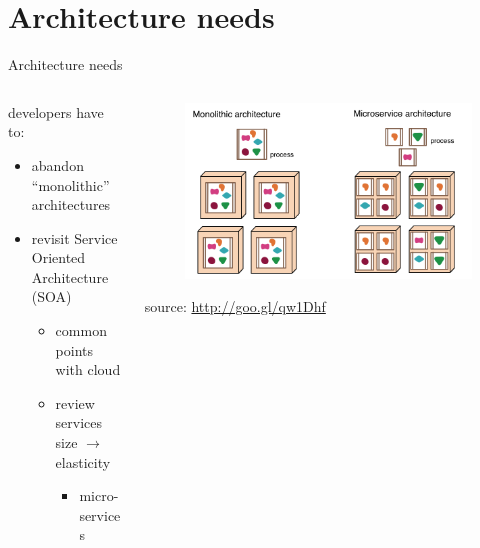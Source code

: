 %
%
\section{Architecture needs}
\begin{frame}{Architecture needs}
	\only<1>
	{
		\begin{columns}
			\begin{column}{0.65\textwidth}
				developers have to:
				\begin{itemize}
					\item{\footnotesize{abandon ``monolithic'' architectures}}
					\item{\footnotesize{revisit Service Oriented Architecture (SOA)}}
					\begin{itemize}
						\item{\scriptsize{common points with cloud}}
						\item{\scriptsize{review services size $\rightarrow{}$ elasticity}}
						\begin{itemize}
							\item{\tiny{micro-services}}
						\end{itemize}
					\end{itemize}
				\end{itemize}
			\end{column}
			\begin{column}{0.35\textwidth}
				\begin{figure}
					\centering{}
					\includegraphics[scale=0.14]{images/micro-services.png}
				\end{figure}
				\begin{flushright}
					\tiny{source: \url{http://goo.gl/qw1Dhf}}
				\end{flushright}
			\end{column}
		\end{columns}
	}
\end{frame}

